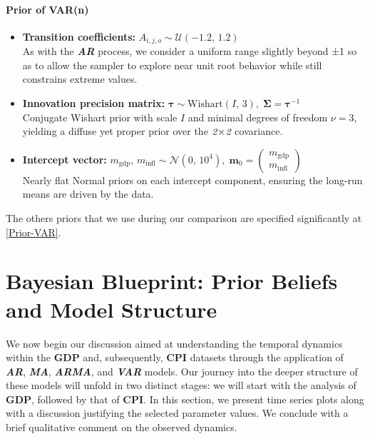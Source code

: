 \documentclass{Configuration_Files/PoliMi3i_thesis}
\begin{document}
\subsubsection{Prior of VAR(n)}
\begin{itemize}
    \item \textbf{Transition coefficients:}  
    $A_{i,j,o} \sim \mathcal{U}(-1.2,\,1.2)$\\
    As with the \textbf{\textit{{AR}}} process, we consider a uniform range slightly beyond ±1 so as to allow the sampler to explore near unit root
behavior while still constrains extreme values.
    \item \textbf{Innovation precision matrix:}  
    $\boldsymbol{\tau} \sim \mathrm{Wishart}(I,\,3),\;\boldsymbol{\Sigma}=\boldsymbol{\tau}^{-1}$\\
    Conjugate Wishart prior with scale \(I\) and minimal degrees of freedom \(\nu=3\), yielding a diffuse yet proper prior over the $\text{\itshape 2}\!\times\!\text{\itshape 2}$ covariance.
    \item \textbf{Intercept vector:}  
    $m_{\text{gdp}},\,m_{\text{infl}} \sim \mathcal{N}(0,\,10^4),\;\mathbf{m}_0=\begin{pmatrix}m_{\text{gdp}}\\m_{\text{infl}}\end{pmatrix}$\\
    Nearly flat Normal priors on each intercept component, ensuring the long-run means are driven by the data.
\end{itemize}
The others priors that we use during our comparison are specified significantly at \ref{Prior-VAR}.

\chapter{Bayesian Blueprint: Prior Beliefs and Model Structure}
We now begin our discussion aimed at understanding the temporal dynamics within the \textbf{GDP} and, subsequently, \textbf{CPI} datasets through the application of \textbf{\textit{AR}}, \textbf{\textit{MA}}, \textbf{\textit{ARMA}}, and \textbf{\textit{VAR}} models. Our journey into the deeper structure of these models will unfold in two distinct stages: we will start with the analysis of \textbf{GDP}, followed by that of \textbf{CPI}.
In this section, we present time series plots along with a discussion justifying the selected parameter values. We conclude with a brief qualitative comment on the observed dynamics.\\
\end{document}
